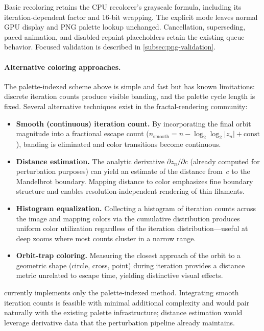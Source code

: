 Basic recoloring retains the CPU recolorer's grayscale formula, including
its iteration-dependent factor and 16-bit wrapping. The explicit mode leaves
normal GPU display and PNG palette lookup unchanged. Cancellation, superseding,
paced animation, and disabled-repaint placeholders retain the existing queue
behavior. Focused validation is described in \cref{subsec:png-validation}.

\paragraph{Alternative coloring approaches.}
The palette-indexed scheme above is simple and fast but has known
limitations: discrete iteration counts produce visible banding, and
the palette cycle length is fixed.  Several alternative techniques
exist in the fractal-rendering community:
\begin{itemize}
  \item \textbf{Smooth (continuous) iteration count.}  By incorporating
    the final orbit magnitude into a fractional escape count
    ($n_{\text{smooth}} = n - \log_2\!\log_2|z_n| + \text{const}$),
    banding is eliminated and color transitions become continuous.
  \item \textbf{Distance estimation.}  The analytic derivative
    $\partial z_n/\partial c$ (already computed for perturbation
    purposes) can yield an estimate of the distance from~$c$ to the
    Mandelbrot boundary.  Mapping distance to color emphasizes fine
    boundary structure and enables resolution-independent rendering of
    thin filaments.
  \item \textbf{Histogram equalization.}  Collecting a histogram of
    iteration counts across the image and mapping colors via the
    cumulative distribution produces uniform color utilization
    regardless of the iteration distribution---useful at deep zooms
    where most counts cluster in a narrow range.
  \item \textbf{Orbit-trap coloring.}  Measuring the closest approach
    of the orbit to a geometric shape (circle, cross, point) during
    iteration provides a distance metric unrelated to escape time,
    yielding distinctive visual effects.
\end{itemize}
\FractalShark{} currently implements only the palette-indexed method.
Integrating smooth iteration counts is feasible with minimal additional
complexity and would
pair naturally with the existing palette infrastructure; distance
estimation would leverage derivative data that the perturbation
pipeline already maintains.

